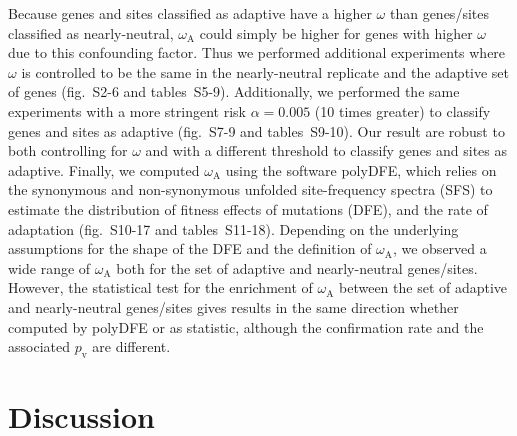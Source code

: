 \documentclass{article}
\newcommand{\rateApop}{\omega_{\mathrm{A}}}
\begin{document}
    Because genes and sites classified as adaptive have a higher $\omega$ than genes/sites classified as nearly-neutral, $\rateApop$ could simply be higher for genes with higher $\omega$ due to this confounding factor.
    Thus we performed additional experiments where $\omega$ is controlled to be the same in the nearly-neutral replicate and the adaptive set of genes (fig.~S2-6 and tables~S5-9).
    Additionally, we performed the same experiments with a more stringent risk $\alpha=0.005$ (10 times greater) to classify genes and sites as adaptive (fig.~S7-9 and tables~S9-10).
    Our result are robust to both controlling for $\omega$ and with a different threshold to classify genes and sites as adaptive.
    Finally, we computed $\rateApop$ using the software polyDFE\cite{tataru_polydfe_2020}, which relies on the synonymous and non-synonymous unfolded site-frequency spectra (SFS) to estimate the distribution of fitness effects of mutations (DFE), and the rate of adaptation (fig.~S10-17 and tables~S11-18).
    Depending on the underlying assumptions for the shape of the DFE and the definition of $\rateApop$, we observed a wide range of $\rateApop$ both for the set of adaptive and nearly-neutral genes/sites.
    However, the statistical test for the enrichment of $\rateApop$ between the set of adaptive and nearly-neutral genes/sites gives results in the same direction whether computed by polyDFE or as \textcite{mcdonald_adaptative_1991} statistic, although the confirmation rate and the associated $p_{\mathrm{v}}$ are different.

    \section*{Discussion}\label{sec:discussion}
\end{document}
